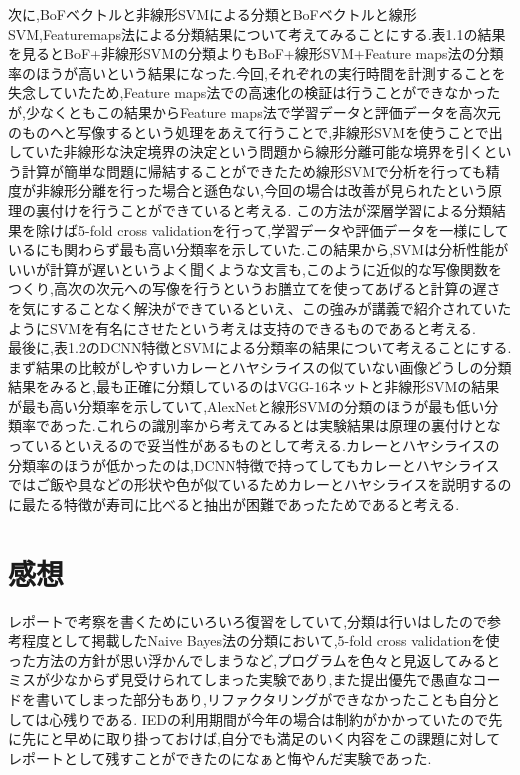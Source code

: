 \documentclass[11pt,a4j]{jreport}
\begin{document}
次に,BoFベクトルと非線形SVMによる分類とBoFベクトルと線形SVM,Featuremaps法による分類結果について考えてみることにする.表1.1の結果を見るとBoF+非線形SVMの分類よりもBoF+線形SVM+Feature maps法の分類率のほうが高いという結果になった.今回,それぞれの実行時間を計測することを失念していたため,Feature maps法での高速化の検証は行うことができなかったが,少なくともこの結果からFeature maps法で学習データと評価データを高次元のものへと写像するという処理をあえて行うことで,非線形SVMを使うことで出していた非線形な決定境界の決定という問題から線形分離可能な境界を引くという計算が簡単な問題に帰結することができたため線形SVMで分析を行っても精度が非線形分離を行った場合と遜色ない,今回の場合は改善が見られたという原理の裏付けを行うことができていると考える.
この方法が深層学習による分類結果を除けば5-fold cross validationを行って,学習データや評価データを一様にしているにも関わらず最も高い分類率を示していた.この結果から,SVMは分析性能がいいが計算が遅いというよく聞くような文言も,このように近似的な写像関数をつくり,高次の次元への写像を行うというお膳立てを使ってあげると計算の遅さを気にすることなく解決ができているといえ、この強みが講義で紹介されていたようにSVMを有名にさせたという考えは支持のできるものであると考える.\\

最後に,表1.2のDCNN特徴とSVMによる分類率の結果について考えることにする.まず結果の比較がしやすいカレーとハヤシライスの似ていない画像どうしの分類結果をみると,最も正確に分類しているのはVGG-16ネットと非線形SVMの結果が最も高い分類率を示していて,AlexNetと線形SVMの分類のほうが最も低い分類率であった.これらの識別率から考えてみるとは実験結果は原理の裏付けとなっているといえるので妥当性があるものとして考える.カレーとハヤシライスの分類率のほうが低かったのは,DCNN特徴で持ってしてもカレーとハヤシライスではご飯や具などの形状や色が似ているためカレーとハヤシライスを説明するのに最たる特徴が寿司に比べると抽出が困難であったためであると考える.
\newpage
\section{感想}
レポートで考察を書くためにいろいろ復習をしていて,分類は行いはしたので参考程度として掲載したNaive Bayes法の分類において,5-fold cross validationを使った方法の方針が思い浮かんでしまうなど,プログラムを色々と見返してみるとミスが少なからず見受けられてしまった実験であり,また提出優先で愚直なコードを書いてしまった部分もあり,リファクタリングができなかったことも自分としては心残りである.
IEDの利用期間が今年の場合は制約がかかっていたので先に先にと早めに取り掛っておけば,自分でも満足のいく内容をこの課題に対してレポートとして残すことができたのになぁと悔やんだ実験であった.
\end{document}
